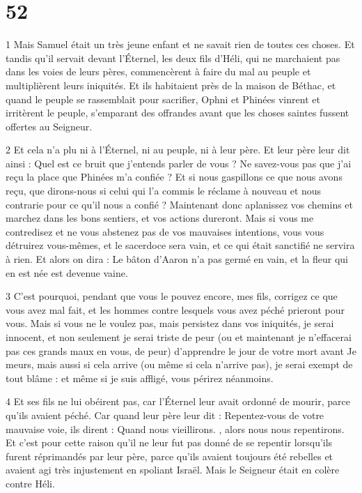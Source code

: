 \chapter{52}

\par 1 Mais Samuel était un très jeune enfant et ne savait rien de toutes ces choses. Et tandis qu'il servait devant l'Éternel, les deux fils d'Héli, qui ne marchaient pas dans les voies de leurs pères, commencèrent à faire du mal au peuple et multiplièrent leurs iniquités. Et ils habitaient près de la maison de Béthac, et quand le peuple se rassemblait pour sacrifier, Ophni et Phinées vinrent et irritèrent le peuple, s'emparant des offrandes avant que les choses saintes fussent offertes au Seigneur.

\par 2 Et cela n'a plu ni à l'Éternel, ni au peuple, ni à leur père. Et leur père leur dit ainsi : Quel est ce bruit que j'entends parler de vous ? Ne savez-vous pas que j'ai reçu la place que Phinées m'a confiée ? Et si nous gaspillons ce que nous avons reçu, que dirons-nous si celui qui l'a commis le réclame à nouveau et nous contrarie pour ce qu'il nous a confié ? Maintenant donc aplanissez vos chemins et marchez dans les bons sentiers, et vos actions dureront. Mais si vous me contredisez et ne vous abstenez pas de vos mauvaises intentions, vous vous détruirez vous-mêmes, et le sacerdoce sera vain, et ce qui était sanctifié ne servira à rien. Et alors on dira : Le bâton d’Aaron n’a pas germé en vain, et la fleur qui en est née est devenue vaine.

\par 3 C'est pourquoi, pendant que vous le pouvez encore, mes fils, corrigez ce que vous avez mal fait, et les hommes contre lesquels vous avez péché prieront pour vous. Mais si vous ne le voulez pas, mais persistez dans vos iniquités, je serai innocent, et non seulement je serai triste de peur (ou et maintenant je n'effacerai pas ces grands maux en vous, de peur) d'apprendre le jour de votre mort avant Je meurs, mais aussi si cela arrive (ou même si cela n'arrive pas), je serai exempt de tout blâme : et même si je suis affligé, vous périrez néanmoins.

\par 4 Et ses fils ne lui obéirent pas, car l'Éternel leur avait ordonné de mourir, parce qu'ils avaient péché. Car quand leur père leur dit : Repentez-vous de votre mauvaise voie, ils dirent : Quand nous vieillirons. , alors nous nous repentirons. Et c'est pour cette raison qu'il ne leur fut pas donné de se repentir lorsqu'ils furent réprimandés par leur père, parce qu'ils avaient toujours été rebelles et avaient agi très injustement en spoliant Israël. Mais le Seigneur était en colère contre Héli.

